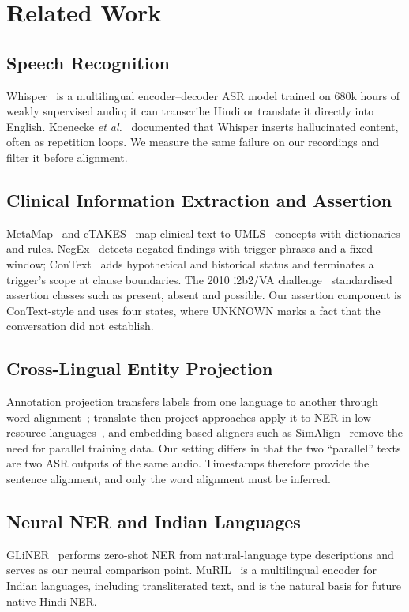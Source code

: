 \documentclass[conference]{IEEEtran}
\begin{document}
\section{Related Work}
\subsection{Speech Recognition}
Whisper~\cite{whisper} is a multilingual encoder–decoder ASR model trained on 680k hours of weakly supervised audio; it can transcribe Hindi or translate it directly into English. Koenecke \emph{et al.}~\cite{careless} documented that Whisper inserts hallucinated content, often as repetition loops. We measure the same failure on our recordings and filter it before alignment.

\subsection{Clinical Information Extraction and Assertion}
MetaMap~\cite{metamap} and cTAKES~\cite{ctakes} map clinical text to UMLS~\cite{umls} concepts with dictionaries and rules. NegEx~\cite{negex} detects negated findings with trigger phrases and a fixed window; ConText~\cite{context} adds hypothetical and historical status and terminates a trigger's scope at clause boundaries. The 2010 i2b2/VA challenge~\cite{i2b2} standardised assertion classes such as present, absent and possible. Our assertion component is ConText-style and uses four states, where UNKNOWN marks a fact that the conversation did not establish.

\subsection{Cross-Lingual Entity Projection}
Annotation projection transfers labels from one language to another through word alignment~\cite{yarowsky}; translate-then-project approaches apply it to NER in low-resource languages~\cite{mayhew}, and embedding-based aligners such as SimAlign~\cite{simalign} remove the need for parallel training data. Our setting differs in that the two “parallel” texts are two ASR outputs of the same audio. Timestamps therefore provide the sentence alignment, and only the word alignment must be inferred.

\subsection{Neural NER and Indian Languages}
GLiNER~\cite{gliner} performs zero-shot NER from natural-language type descriptions and serves as our neural comparison point. MuRIL~\cite{muril} is a multilingual encoder for Indian languages, including transliterated text, and is the natural basis for future native-Hindi NER.
\end{document}
